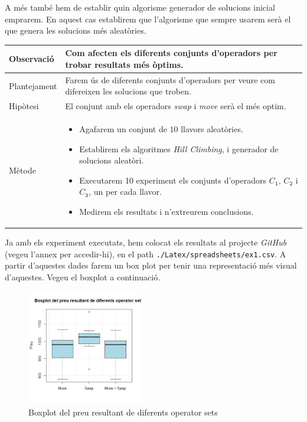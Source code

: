 \documentclass[a4paper]{article}
\begin{document}
	A més també hem de establir quin algorisme generador de solucions inicial emprarem. En aquest cas establirem que l'algorisme que sempre usarem serà el que genera les solucions més aleatòries.
	
	\begin{table}[ht]
		\centering
		\begin{tabular}{|l|p{10cm}|}
			\hline
			Observació & Com afecten els diferents conjunts d'operadors per trobar resultats més òptims. \\
			\hline
			Plantejament & Farem ús de diferents conjunts d'operadors per veure com difereixen les solucions que troben. \\
			\hline
			Hipòtesi & El conjunt amb els operadors \textit{swap} i \textit{move} serà el més optim. \\
			\hline
			Mètode & 
			\begin{itemize}
				\item Agafarem un conjunt de $10$ llavors aleatòries.
				\item Establirem els algoritmes \textit{Hill Climbing}, i generador de solucions aleatòri.
				\item Executarem 10 experiment els conjunts d'operadors $C_{\texttt{1}}$, $C_{\texttt{2}}$ i $C_{\texttt{3}}$, un per cada llavor.
				\item Medirem els resultats i n'extreurem conclusions.
			\end{itemize} \\
			\hline
		\end{tabular}
		\label{tab:exp1_apartats}
	\end{table}
	
	Ja amb els experiment executats, hem colocat els resultats al projecte \textit{GitHub} (vegeu l'annex per accedir-hi), en el path \texttt{./Latex/spreadsheets/ex1.csv}. A partir d'aquestes dades farem un box plot per tenir una representació més visual d'aquestes. Vegeu el boxplot a continuació.
	
	\begin{figure}[H]
		\centering
		\includegraphics[width=0.45\textwidth]{images/exp1_boxplot.png}
		\caption{Boxplot del preu resultant de diferents operator sets}
		\label{fig:exp1_boxplot}
	\end{figure}
	
\end{document}
